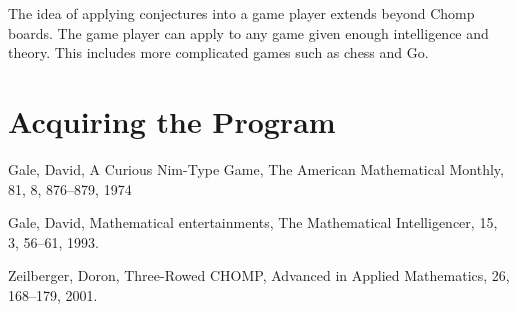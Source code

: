 \documentclass{amsart}
\theoremstyle{definition}
\theoremstyle{remark}
\numberwithin{equation}{section}
\begin{document}










The idea of applying conjectures into a game player extends beyond Chomp boards.  The game player can apply to any game given enough intelligence and theory.  This includes more complicated games such as chess and Go.









\section{Acquiring the Program}
\label{acquiring}






\begin{thebibliography}{99}
Gale, David,
A Curious Nim-Type Game,
The American Mathematical Monthly, 81, 8, 876--879, 1974

Gale, David,
Mathematical entertainments,
The Mathematical Intelligencer, 15, 3, 56--61, 1993.

Zeilberger, Doron, 
Three-Rowed CHOMP,
Advanced in Applied Mathematics, 26, 168--179, 2001.


\end{thebibliography}
\end{document}
